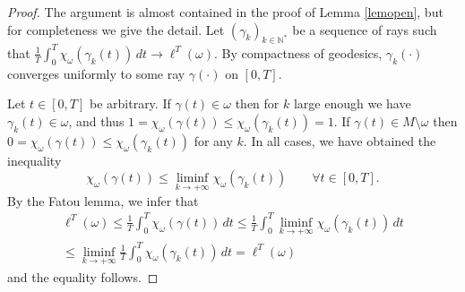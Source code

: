 \documentclass[JEP,XML,SOM,Unicode, NoEqCountersInSection,NoFloatCountersInSection,published]{cedram}
\def\N{\mathbb{N}}
\theoremstyle{definition}
\begin{document}
\begin{proof}
The argument is almost contained in the proof of Lemma \ref{lemopen}, but for completeness we give the detail.
Let $(\gamma_k)_{k\in\N^*}$ be a sequence of rays such that $\frac{1}{T}\int_0^T\chi_\omega(\gamma_k(t))\, dt \rightarrow \ell^T(\omega)$. By compactness of geodesics, $\gamma_k(\cdot)$ converges uniformly to some ray $\gamma(\cdot)$ on $[0,T]$.

Let $t\in[0,T]$ be arbitrary. If $\gamma(t)\in \omega$ then for $k$ large enough we have $\gamma_k(t)\in \omega$, and thus $1=\chi_{\omega}(\gamma(t))\leq \chi_{\omega}(\gamma_k(t))=1$. If $\gamma(t)\in M\setminus\omega$ then $0=\chi_{\omega}(\gamma(t))\leq \chi_{\omega}(\gamma_k(t))$ for any $k$. In all cases, we have obtained the inequality
\[
\chi_{\omega}(\gamma(t)) \leq \liminf_{k\rightarrow+\infty} \chi_{\omega}(\gamma_k(t)) \qquad \forall t\in[0,T].
\]
By the Fatou lemma, we infer that
\begin{multline*}
\ell^T(\omega)\leq \frac{1}{T}\int_0^T\chi_\omega(\gamma(t))\, dt \leq \frac{1}{T}\int_0^T \liminf_{k\rightarrow+\infty}\chi_\omega(\gamma_k(t))\, dt \\
\leq \liminf_{k\rightarrow+\infty} \frac{1}{T}\int_0^T \chi_\omega(\gamma_k(t))\, dt = \ell^T(\omega)
\end{multline*}
and the equality follows.
\end{proof}




\end{document}
